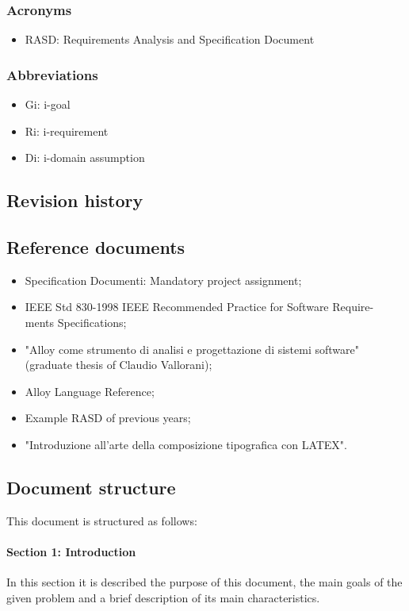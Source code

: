 \documentclass[12pt,titlepage]{article}
\begin{document}
\subsubsection{Acronyms}\label{RASD}
\begin{itemize}
\item	RASD: Requirements Analysis and Specification Document
\end{itemize}
\subsubsection{Abbreviations}\label{RASD}
\begin{itemize}
\item	Gi: i-goal
\item	Ri: i-requirement
\item	Di: i-domain assumption
\end{itemize}
\subsection{Revision history}\label{RASD}

\subsection{Reference documents}\label{RASD}
\begin{itemize}
\item Specification Documenti: Mandatory project assignment;
\item IEEE Std 830-1998 IEEE Recommended Practice for Software Require-
ments Specifications;
\item "Alloy come strumento di analisi e progettazione di sistemi software" (graduate thesis of Claudio Vallorani);
\item Alloy Language Reference;
\item Example RASD of previous years;
\item "Introduzione all'arte della composizione tipografica con LATEX".
\end{itemize}


\subsection{Document structure}\label{RASD}
This document is structured as follows:
\paragraph{Section 1: Introduction}
In this section it is described the purpose of this document, the main goals of the given problem and a brief description of its main characteristics. 
\end{document}
